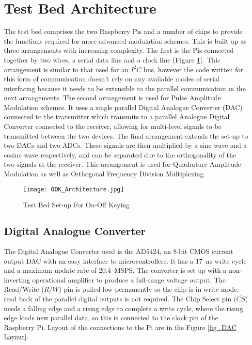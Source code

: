 \documentclass[../main.tex]{subfiles}
\begin{document}
\section{Test Bed Architecture}

The test bed comprises the two Raspberry Pis and a number of chips to provide the functions required for more advanced modulation schemes.
This is built up as three arrangements with increasing complexity.
The first is the Pis connected together by two wires, a serial data line and a clock line (Figure \ref{fig_OOK Architecture}).
This arrangement is similar to that used for an $I^2C$ bus, however the code written for this form of communication doesn't rely on any available modes of serial interfacing because it needs to be extensible to the parallel communication in the next arrangements.
The second arrangement is used for Pulse Amplitude Modulation schemes.
It uses a single parallel Digital Analogue Converter (DAC) connected to the transmitter which transmits to a parallel Analogue Digital Converter connected to the receiver, allowing for multi-level signals to be transmitted between the two devices.
The final arrangement extends the set-up to two DACs and two ADCs.
These signals are then multiplied by a sine wave and a cosine wave respectively, and can be separated due to the orthogonality of the two signals at the receiver.
This arrangement is used for Quadrature Amplitude Modulation as well as Orthogonal Frequency Division Multiplexing.\\

\begin{figure}[ht]
	\centering
	\texttt{[image: OOK\_Architecture.jpg]}
	\caption{Test Bed Set-up For On-Off Keying}
	\label{fig_OOK Architecture}
\end{figure}

\subsection{Digital Analogue Converter}

The Digital Analogue Converter used is the AD5424, an 8-bit CMOS current output DAC with an easy interface to microcontrollers.
It has a \SI{17}{\nano\second} write cycle and a maximum update rate of \SI{20.4}{MSPS}. %
The converter is set up with a non-inverting operational amplifier to produce a full-range voltage output.
The Read/Write ($R/\overline{W}$) pin is pulled low permanently so the chip is in write mode; read back of the parallel digital outputs is not required.
The Chip Select pin ($\overline{CS}$) needs a falling edge and a rising edge to complete a write cycle, where the rising edge loads new parallel data, so this is connected to the clock pin of the Raspberry Pi.
Layout of the connections to the Pi are in the Figure \ref{fig_DAC Layout}.\\
\end{document}
